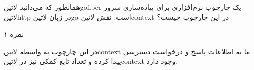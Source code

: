 
همانطور که می‌دانید ‌لاتین{gofiber} یک چارچوب نرم‌افزاری برای پیاده‌سازی سرور ‌لاتین{http} در زبان ‌لاتین{go} است.
نقش ‌لاتین{context} در این چارچوب چیست؟

۱ نمره


در این چارچوب به واسطه ‌لاتین{context} ما به اطلاعات پاسخ و درخواست دسترسی پیدا کرده و تعداد تابع کمکی نیز در ‌لاتین{context} وجود دارد.

